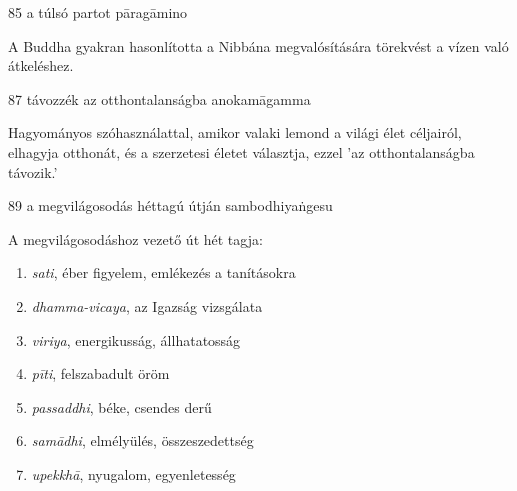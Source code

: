 
\begin{notesdescription}

\item[{85}
{a túlsó partot}
{pāragāmino}] \hfill\par

A Buddha gyakran hasonlította a Nibbána megvalósítására törekvést a vízen való átkeléshez.

\item[{87}
{távozzék az otthontalanságba}
{anokamāgamma}] \hfill\par

Hagyományos szóhasználattal, amikor valaki lemond a világi élet céljairól, elhagyja otthonát, és a szerzetesi életet választja, ezzel 'az otthontalanságba távozik.'

\item[{89}
{a megvilágosodás héttagú útján}
{sambodhiyaṅgesu}] \hfill\par

A megvilágosodáshoz vezető út hét tagja:
\begin{enumerate}
    \item \textit{sati}, éber figyelem, emlékezés a tanításokra
    \item \textit{dhamma-vicaya}, az Igazság vizsgálata
    \item \textit{viriya}, energikusság, állhatatosság
    \item \textit{pīti}, felszabadult öröm
    \item \textit{passaddhi}, béke, csendes derű
    \item \textit{samādhi}, elmélyülés, összeszedettség
    \item \textit{upekkhā}, nyugalom, egyenletesség
\end{enumerate}

\end{notesdescription}

